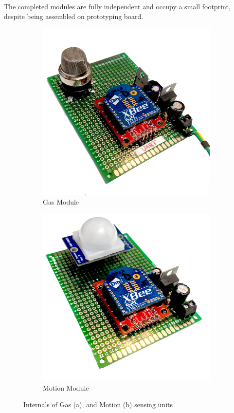 	\par The completed modules are fully independent and occupy a small footprint, despite being assembled on prototyping board. 
	\begin{figure}[h]
		\centering
		\begin{subfigure}[t]{0.45\textwidth}
			\centering
			\includegraphics[width=\linewidth]{module_gas.jpg}
			\caption{Gas Module}
			\label{fig:gasUnit}
		\end{subfigure}
		\begin{subfigure}[t]{0.45\textwidth}
			\centering
			\includegraphics[width=\linewidth]{module_motion.jpg}
			\caption{Motion Module}
			\label{fig:motionUnit}
		\end{subfigure}
		\caption{Internals of Gas (a), and Motion (b) sensing units}
	\end{figure}
